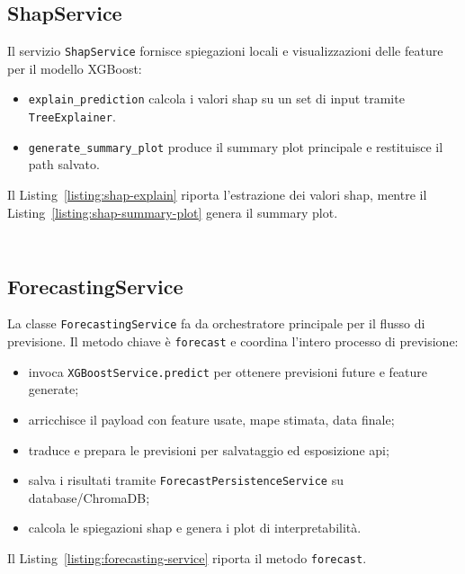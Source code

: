 \subsection{ShapService}
Il servizio \texttt{ShapService} fornisce spiegazioni locali e visualizzazioni delle feature per il modello XGBoost:
\begin{itemize}
    \item \texttt{explain\_prediction} calcola i valori \acrshort{shap} su un set di input tramite \texttt{TreeExplainer}.
    \item \texttt{generate\_summary\_plot} produce il summary plot principale e restituisce il path salvato.
\end{itemize}
Il Listing~\ref{listing:shap-explain} riporta l’estrazione dei valori \acrshort{shap}, mentre il Listing~\ref{listing:shap-summary-plot} genera il summary plot.
\captionsetup{type=listing, belowskip=0pt}
\inputminted[fontsize=\small, breaklines, breakanywhere=true, linenos=true, bgcolor=gray!10]{python}{code/services/def/shap_explain.py}
\label{listing:shap-explain}
\captionsetup{type=listing, belowskip=0pt}
\inputminted[fontsize=\small, breaklines, breakanywhere=true, linenos=true, bgcolor=gray!10]{python}{code/services/def/shap_summary_plot.py}
\label{listing:shap-summary-plot}
\subsection{ForecastingService}
La classe \texttt{ForecastingService} fa da orchestratore principale per il flusso di previsione.
Il metodo chiave è \texttt{forecast} e coordina l’intero processo di previsione:
\begin{itemize}
    \item invoca \texttt{XGBoostService.predict} per ottenere previsioni future e feature generate;
    \item arricchisce il payload con feature usate, \acrshort{mape} stimata, data finale;
    \item traduce e prepara le previsioni per salvataggio ed esposizione \acrshort{api};
    \item salva i risultati tramite \texttt{ForecastPersistenceService} su database/ChromaDB;
    \item calcola le spiegazioni \acrshort{shap} e genera i plot di interpretabilità.
\end{itemize}
Il Listing~\ref{listing:forecasting-service} riporta il metodo \texttt{forecast}.
\captionsetup{type=listing, belowskip=0pt}
\inputminted[fontsize=\small, breaklines, breakanywhere=true, linenos=true, bgcolor=gray!10]{python}{code/services/forecasting_service.py}
\label{listing:forecasting-service}

